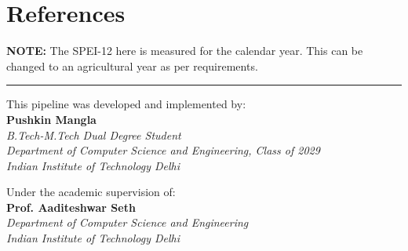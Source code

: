 \documentclass[12pt, a4paper]{article}
\begin{document}
\clearpage %

\section{References}
\printbibliography

\vspace{1cm}
\noindent \textbf{NOTE:} The SPEI-12 here is measured for the calendar year. This can be changed to an agricultural year as per requirements.

\vfill %

\begin{flushleft}
\hrule
\vspace{0.5cm}
\noindent This pipeline was developed and implemented by: \\
\textbf{Pushkin Mangla} \\
\textit{B.Tech-M.Tech Dual Degree Student} \\
\textit{Department of Computer Science and Engineering, Class of 2029} \\
\textit{Indian Institute of Technology Delhi}
\vspace{0.5cm}

\noindent Under the academic supervision of: \\
\textbf{Prof. Aaditeshwar Seth} \\
\textit{Department of Computer Science and Engineering} \\
\textit{Indian Institute of Technology Delhi}
\end{flushleft}
\end{document}
